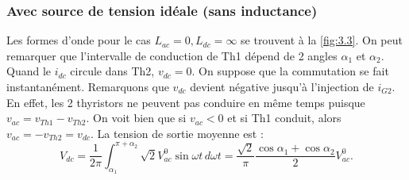			\subsubsection{Avec source de tension idéale (sans inductance)}
				Les formes d'onde pour le cas $L_{ac} = 0, L_{dc} = \infty$ se trouvent à la \autoref{fig:3.3}. On peut remarquer que l'intervalle de conduction de Th1 dépend de 2 angles $\alpha _1$ et $\alpha _2$. Quand le $i_{dc}$ circule dans Th2, $v_{dc} = 0$. On suppose que la commutation se fait instantanément. Remarquons que $v_{dc}$ devient négative jusqu'à l'injection de $i_{G2}$. En effet, les 2 thyristors ne peuvent pas conduire en même temps puisque $v_{ac} = v_{Th1} - v_{Th2}$. On voit bien que si $v_{ac} < 0$ et si Th1 conduit, alors $v_{ac} = -v_{Th2} = v_{dc}$. La tension de sortie moyenne est : 
				\begin{equation}
					V_{dc} = \frac{1}{2\pi} \int _{\alpha _1} ^{\pi + \alpha _2} \sqrt{2} V_{ac}^0\sin \omega t \, d\omega t = \frac{\sqrt{2}}{\pi} \frac{\cos \alpha _1 + \cos \alpha _2}{2} V_{ac}^0.
 				\end{equation}
		
